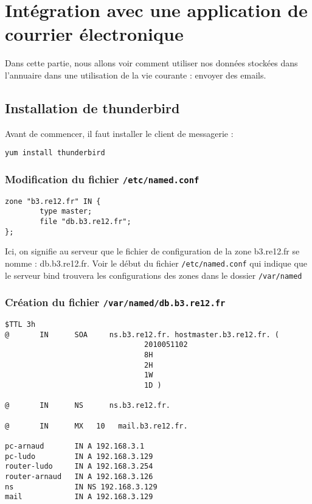 \documentclass[12pt,a4paper,notitlepage]{article}
\begin{document}
\section{Intégration avec une application de courrier électronique}

Dans cette partie, nous allons voir comment utiliser nos données stockées dans l'annuaire dans une utilisation de la vie courante : envoyer des emails.
\subsection{Installation de thunderbird}

Avant de commencer, il faut installer le client de messagerie :
\begin{verbatim}
yum install thunderbird
\end{verbatim}


\bigskip

\subsubsection{Modification du fichier \texttt{/etc/named.conf}}

\begin{lstlisting}[title=Lignes à ajouter]
zone "b3.re12.fr" IN {
        type master;
        file "db.b3.re12.fr";
};
\end{lstlisting}

Ici, on signifie au serveur que le fichier de configuration de la zone b3.re12.fr se nomme : db.b3.re12.fr. Voir le début du fichier \texttt{/etc/named.conf} qui indique que le serveur bind trouvera les configurations des zones dans le dossier \texttt{/var/named}

\subsubsection{Création du fichier \texttt{/var/named/db.b3.re12.fr}}

\begin{lstlisting}[title=Ensemble des paramètres de la zone]
$TTL 3h
@       IN      SOA     ns.b3.re12.fr. hostmaster.b3.re12.fr. (
                                2010051102
                                8H
                                2H
                                1W
                                1D )

@       IN      NS      ns.b3.re12.fr.

@       IN      MX   10   mail.b3.re12.fr.

pc-arnaud       IN A 192.168.3.1
pc-ludo         IN A 192.168.3.129
router-ludo     IN A 192.168.3.254
router-arnaud   IN A 192.168.3.126
ns              IN NS 192.168.3.129
mail            IN A 192.168.3.129
\end{lstlisting}
\end{document}
